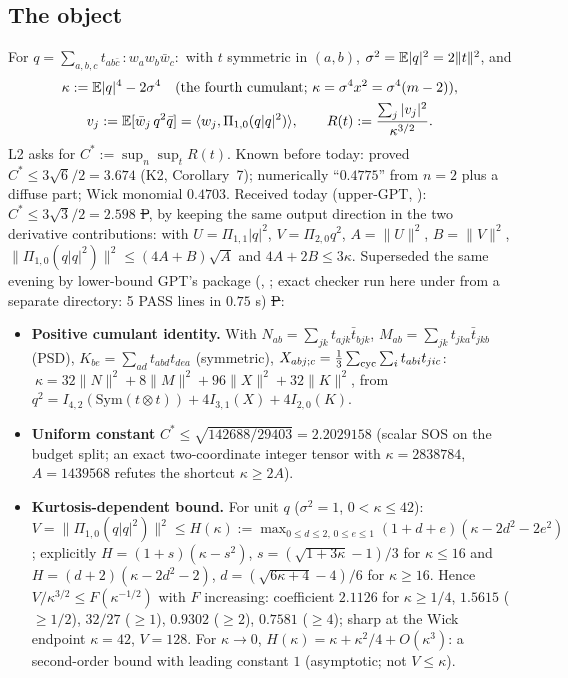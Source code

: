 \subsection{The object}
For $q=\sum_{a,b,c}t_{ab\bar c}\,{:}w_aw_b\bar w_c{:}$ with $t$ symmetric in $(a,b)$, $\sigma^2=\mathbb E|q|^2=2\|t\|^2$, and
\[\begin{gathered}
\kappa:=\mathbb E|q|^4-2\sigma^4\quad(\text{the fourth cumulant; }\kappa=\sigma^4x^2=\sigma^4(m-2)),\\
v_j:=\mathbb E[\bar w_j\,q^2\bar q]=\langle w_j,\Pi_{1,0}(q|q|^2)\rangle,\qquad R(t):=\frac{\sum_j|v_j|^2}{\kappa^{3/2}} .
\end{gathered}\]
L2 asks for $C^*:=\sup_{n}\sup_{t}R(t)$. Known before today: proved $C^*\le3\sqrt6/2=3.674$ (K2, Corollary~7); numerically ``$0.4775$'' from $n=2$ plus a diffuse part;
Wick monomial $0.4703$. Received today (upper-GPT, ): \textbf{$C^*\le3\sqrt3/2=2.598$} \st{P}, by keeping the same output direction in the two
derivative contributions: with $U=\Pi_{1,1}|q|^2$, $V=\Pi_{2,0}q^2$, $A=\|U\|^2$, $B=\|V\|^2$, $\|\Pi_{1,0}(q|q|^2)\|^2\le(4A+B)\sqrt A$ and $4A+2B\le3\kappa$.
Superseded the same evening by lower-bound GPT's package  (, ;
exact checker  run here under  from a separate directory: 5 PASS lines in $0.75$ s) \st{P}:
\begin{itemize}
\item \textbf{Positive cumulant identity.} With $N_{ab}=\sum_{jk}t_{ajk}\bar t_{bjk}$, $M_{ab}=\sum_{jk}t_{jka}\bar t_{jkb}$ (PSD), $K_{be}=\sum_{ad}t_{abd}t_{dea}$ (symmetric),
$X_{abj;c}=\frac13\sum_{\rm cyc}\sum_it_{abi}t_{jic}$: $\ \kappa=32\|N\|^2+8\|M\|^2+96\|X\|^2+32\|K\|^2$, from $q^2=I_{4,2}(\mathrm{Sym}(t\otimes t))+4I_{3,1}(X)+4I_{2,0}(K)$.
\item \textbf{Uniform constant} $C^*\le\sqrt{142688/29403}=2.2029158$ (scalar SOS on the budget split; an exact two-coordinate integer tensor with $\kappa=2838784$, $A=1439568$
refutes the shortcut $\kappa\ge2A$).
\item \textbf{Kurtosis-dependent bound.} For unit $q$ ($\sigma^2=1$, $0<\kappa\le42$): $V=\|\Pi_{1,0}(q|q|^2)\|^2\le H(\kappa):=\max_{0\le d\le2,\,0\le e\le1}(1+d+e)(\kappa-2d^2-2e^2)$;
explicitly $H=(1+s)(\kappa-s^2)$, $s=(\sqrt{1+3\kappa}-1)/3$ for $\kappa\le16$ and $H=(d+2)(\kappa-2d^2-2)$, $d=(\sqrt{6\kappa+4}-4)/6$ for $\kappa\ge16$. Hence
$V/\kappa^{3/2}\le F(\kappa^{-1/2})$ with $F$ increasing: coefficient $2.1126$ for $\kappa\ge1/4$, $1.5615$ ($\ge1/2$), $32/27$ ($\ge1$), $0.9302$ ($\ge2$), $0.7581$ ($\ge4$); sharp at the
Wick endpoint $\kappa=42$, $V=128$. For $\kappa\to0$, $H(\kappa)=\kappa+\kappa^2/4+O(\kappa^3)$: a second-order bound with leading constant $1$ (asymptotic; not $V\le\kappa$).
\end{itemize}

